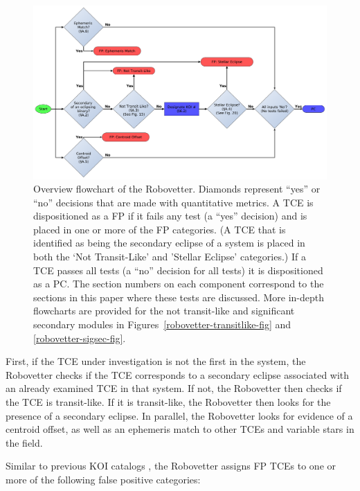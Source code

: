 \begin{figure}[htbp]
\centering
\includegraphics[width=0.9\linewidth]{RoboVetter-Diagram-V4-Overview.pdf}
\caption{Overview flowchart of the Robovetter. Diamonds represent ``yes'' or ``no'' decisions that are made with quantitative metrics. A TCE is dispositioned as a FP if it fails any test (a ``yes'' decision) and is placed in one or more of the FP categories. (A TCE that is identified as being the secondary eclipse of a system is placed in both the `Not Transit-Like' and 'Stellar Eclipse' categories.) If a TCE passes all tests (a ``no'' decision for all tests) it is dispositioned as a PC. The section numbers on each component correspond to the sections in this paper where these tests are discussed. More in-depth flowcharts are provided for the not transit-like and significant secondary modules in Figures~\ref{robovetter-transitlike-fig} and \ref{robovetter-sigsec-fig}.}
\label{robovetter-overview-fig}
\end{figure}


First, if the TCE under investigation is not the first in the system, the Robovetter checks if the TCE corresponds to a secondary eclipse associated with an already examined TCE in that system. If not, the Robovetter then checks if the TCE is transit-like. If it is transit-like, the Robovetter then looks for the presence of a secondary eclipse. In parallel, the Robovetter looks for evidence of a centroid offset, as well as an ephemeris match to other TCEs and variable stars in the \kepler{} field. 

\label{s:majorflags}
Similar to previous KOI catalogs \citep{Coughlin2016, Mullally2015cat, Rowe2015cat}, the Robovetter assigns FP TCEs to one or more of the following false positive categories:


